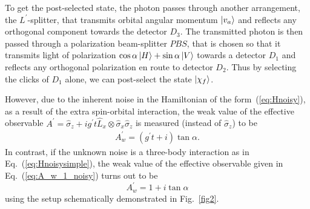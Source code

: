 \documentclass[aps,pra,showpacs,twoside,twocolumn,10pt]{revtex4-1}
\begin{document}
To get the post-selected state, the photon passes through another arrangement, the $L^\prime$-splitter, that transmits orbital angular momentum $\ket{v_a}$ and reflects any orthogonal component towards the detector $D_3$. The transmitted photon is then passed through a polarization beam-splitter $PBS$, that is chosen so that it transmits light of polarization $\cos\alpha\ket{H}+\sin\alpha\ket{V}$ towards a detector $D_1$ and reflects any orthogonal polarization en route to detector $D_2$. Thus by selecting the clicks of $D_1$ alone, we can post-select the state $\ket{\chi_f}$. %
     
However, due to the inherent noise in the Hamiltonian of the form~(\ref{eq:Hnoisy}), as a result of the extra spin-orbital interaction, the weak value of the effective observable 
$A^{\prime}=\hat{\sigma}_z+ig^\prime t \hat{L}_x\otimes\hat{\sigma}_x\hat{\sigma}_z$ is measured (instead of \(\hat{\sigma}_z\)) to be %
\begin{eqnarray}
 A^\prime_w={(g^\prime t+i)\tan\alpha}.
\label{A_wk}
\end{eqnarray}
In contrast, if the unknown noise is a three-body interaction as in Eq.~(\ref{eq:Hnoisysimple}), the weak value of the effective observable given in Eq.~(\ref{eq:A_w_1_noisy}) turns out to be
\begin{equation}
   A_w^{\prime}=1+i \tan\alpha
    \label{A_wk1}
\end{equation} 
using the setup schematically demonstrated in Fig.~\ref{fig2}.
\end{document}

